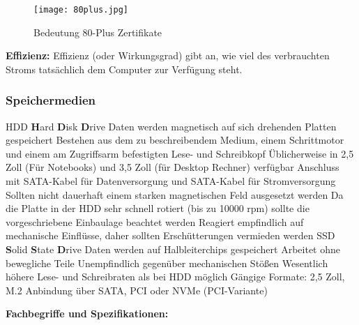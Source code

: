 \documentclass[asp1.tex]{subfiles}
\begin{document}
\begin{figure}[H]
    \centering
    \texttt{[image: 80plus.jpg]}
    \caption{Bedeutung 80-Plus Zertifikate}
\end{figure}

\textbf{Effizienz:}
Effizienz (oder Wirkungsgrad) gibt an, wie viel des verbrauchten Stroms tatsächlich dem Computer zur Verfügung steht.


\subsubsection{Speichermedien}

\begin{outline}
    \1 HDD
    \2 \textbf{H}ard \textbf{D}isk \textbf{D}rive
    \2 Daten werden magnetisch auf sich drehenden Platten gespeichert
    \2 Bestehen aus dem zu beschreibendem Medium, einem Schrittmotor und einem am Zugriffsarm befestigten Lese- und Schreibkopf
    \2 Üblicherweise in 2,5 Zoll (Für Notebooks) und 3,5 Zoll (für Desktop Rechner) verfügbar
    \2 Anschluss mit SATA-Kabel für Datenversorgung und SATA-Kabel für Stromversorgung
    \2 Sollten nicht dauerhaft einem starken magnetischen Feld ausgesetzt werden
    \2 Da die Platte in der HDD sehr schnell rotiert (bis zu 10000 rpm) sollte die vorgeschriebene Einbaulage beachtet werden
    \2 Reagiert empfindlich auf mechanische Einflüsse, daher sollten Erschütterungen vermieden werden
    \1 SSD
    \2 \textbf{S}olid \textbf{S}tate \textbf{D}rive
    \2 Daten werden auf Halbleiterchips gespeichert
    \2 Arbeitet ohne bewegliche Teile
    \2 Unempfindlich gegenüber mechanischen Stößen
    \2 Wesentlich höhere Lese- und Schreibraten als bei HDD möglich
    \2 Gängige Formate: 2,5 Zoll, M.2
    \2 Anbindung über SATA, PCI oder NVMe (PCI-Variante)
\end{outline}

\textbf{Fachbegriffe und Spezifikationen:}
\end{document}
